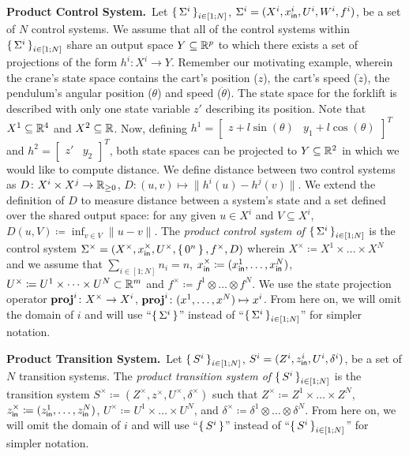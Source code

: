 \smallskip
\noindent\textbf{Product Control System.}\
Let $\set{\Sigma^i}_{i\in [1;N]}$, $\Sigma^i=(X^i,x_{\mathsf{in}}^i,U^i,W^i,f^i)$, be a set of $N$ control systems. 
We assume that all of the control systems within $\set{\Sigma^i}_{i\in [1;N]}$ share an output space $Y\subseteq\mathbb{R}^p$ to which there exists a set of projections of the form $h^i\colon X^i\rightarrow Y$. Remember our motivating example, wherein the crane's state space contains the cart's position ($z$), the cart's speed ($\dot z$), the pendulum's angular position ($\theta$) and speed ($\dot \theta$). The state space for the forklift is described with only one state variable $z'$ describing its position. Note that $X^1\subseteq \mathbb{R}^4$ and $X^2\subseteq \mathbb{R}$. Now, defining $h^1=\begin{bmatrix}z+l\sin(\theta)&y_1+l\cos(\theta)\end{bmatrix}^T$ and $h^2=\begin{bmatrix}z'&y_2\end{bmatrix}^T$, both state spaces can be projected to $Y\subseteq \mathbb{R}^2$ in which we would like to compute distance.
We define distance between two control systems as $D\colon X^i\times X^j\rightarrow \mathbb{R}_{\geq 0}$, $D\colon (u,v)\mapsto\| h^i(u)-h^j(v)\|$. We extend the definition of $D$ to measure distance between a system's state and a set defined over the shared output space: for any given $u\in X^i$ and $V\subseteq X^i$, $D(u,V) \coloneqq \inf_{v\in V}\|u-v\|$. The \emph{product control system of } $\set{\Sigma^i}_{i\in [1;N]}$ is the control system $\Sigma^\times = (X^\times, x_{\mathsf{in}}^\times, U^\times, \set{0^n}, f^\times, D)$ wherein $X^\times\coloneqq X^1\times \ldots \times X^N$ and we assume that $\sum_{i\in [1;N]} n_i=n$, $x_{\mathsf{in}}^\times\coloneqq (x_{\mathsf{in}}^1,\ldots,x_{\mathsf{in}}^N)$, $U^\times\coloneqq U^1\times\dots\times U^N\subset \mathbb{R}^m$ and $f^\times\coloneqq f^{1}\otimes \ldots\otimes f^{N}$. 
We use the state projection operator $\mathbf{proj}^{i}\colon X^\times\to X^i$, $\mathbf{proj}^{i}\colon (x^1,\ldots,x^N)\mapsto x^i$.
From here on, we will omit the domain of $i$ and will use ``$\set{\Sigma^i}$'' instead of ``$\set{\Sigma^i}_{i\in [1;N]}$'' for simpler notation.

\smallskip
\noindent\textbf{Product Transition System.}\
Let $\set{S^i}_{i\in [1;N]}$, $S^i=(Z^i,z_{\mathsf{in}}^i,U^i,\delta^i)$, be a set of $N$ transition systems.
The \emph{product transition system of } $\set{S^i}_{i\in [1;N]}$ is the transition system $S^\times \coloneqq (Z^\times, z^\times, U^\times, \delta^\times)$ such that $Z^\times \coloneqq Z^1\times \ldots \times Z^N$, $z^\times_{\mathsf{in}}\coloneqq (z_{\mathsf{in}}^1,\ldots,z_{\mathsf{in}}^N)$, $U^\times \coloneqq U^1\times \ldots\times U^N$, and $\delta^\times \coloneqq \delta^1\otimes\ldots \otimes \delta^N$.
From here on, we will omit the domain of $i$ and will use ``$\set{S^i}$'' instead of ``$\set{S^i}_{i\in [1;N]}$'' for simpler notation.

